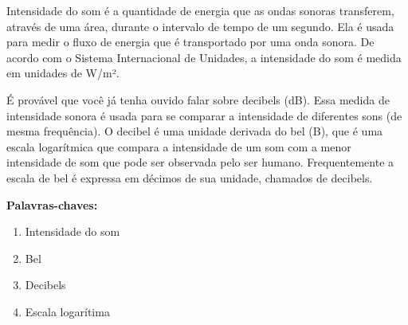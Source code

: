 \documentclass[
	article,		
	11pt,			
	oneside,		
	a4paper,			
	english,			
	brazil			
]{abntex2}
\begin{document}
\maketitle

\begin{resumoumacoluna}
Intensidade do som é a quantidade de energia que as ondas sonoras transferem, através de uma área, durante o intervalo de tempo de um segundo. Ela é usada para medir o fluxo de energia que é transportado por uma onda sonora. De acordo com o Sistema Internacional de Unidades, a intensidade do som é medida em unidades de W/m².

É provável que você já tenha ouvido falar sobre decibels (dB). Essa medida de intensidade sonora é usada para se comparar a intensidade de diferentes sons (de mesma frequência). O decibel é uma unidade derivada do bel (B), que é uma escala logarítmica que compara a intensidade de um som com a menor intensidade de som que pode ser observada pelo ser humano. Frequentemente a escala de bel é expressa em décimos de sua unidade, chamados de decibels.\cite{HELERBROCKIntensidadeSomBrasilEscola}

\vspace{\onelineskip}
\noindent
\textbf{Palavras-chaves:}
\begin{enumerate}
    \item Intensidade do som 
    \item Bel
    \item Decibels
    \item Escala logarítima
\end{enumerate}
\end{resumoumacoluna}
\end{document}
